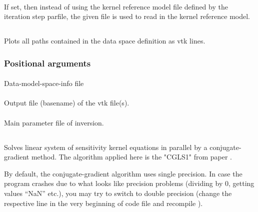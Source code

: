\paragraph{}
If set, then instead of using the kernel reference model file defined by the iteration step parfile, 
the given file  is used to read in the kernel reference model.
%
%
\subsection{} \label{programs_scripts,sec:bin_prog,sec:path_to_vtk}  
Plots all paths contained in the data space definition as vtk lines. 
\subsubsection{Positional arguments}
\paragraph{}
Data-model-space-info file   
\paragraph{}
Output file (basename) of the vtk file(s).
\paragraph{}
Main parameter file of inversion.  
%
%
\subsection{} \label{programs_scripts,sec:bin_prog,sec:solve_cgls_kernel_sys}
Solves linear system of sensitivity kernel equations in parallel by a conjugate-gradient method.
The algorithm applied here is the "CGLS1" from paper \cite{bjorck1998stability}.

By default, the conjugate-gradient algorithm uses single precision. In case the program crashes due to what
looks like precision problems (dividing by 0, getting values ``NaN'' etc.), you may try to switch to 
double precision (change the respective line in the very beginning of code file 
and recompile ).

